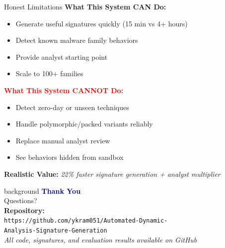 \documentclass[11pt,aspectratio=16:9]{beamer}
\begin{document}
\begin{frame}{Honest Limitations}
  \vspace{0.5cm}
  {\textbf{\textcolor{accent1}{What This System CAN Do:}}}
  \begin{itemize}
    \item Generate useful signatures quickly (15 min vs 4+ hours)
    \item Detect known malware family behaviors
    \item Provide analyst starting point
    \item Scale to 100+ families
  \end{itemize}
  
  \vspace{0.5cm}
  {\textbf{\textcolor{red}{What This System CANNOT Do:}}}
  \begin{itemize}
    \item Detect zero-day or unseen techniques
    \item Handle polymorphic/packed variants reliably
    \item Replace manual analyst review
    \item See behaviors hidden from sandbox
  \end{itemize}
  
  \vspace{0.5cm}
  \begin{tcolorbox}[colback=accent3!10, colframe=accent3, boxrule=2pt]
    \centering
    \textbf{Realistic Value:} \textit{22\% faster signature generation + analyst multiplier}
  \end{tcolorbox}
\end{frame}

\begin{frame}
\vfill
\centering
\begin{beamercolorbox}[center,wd=\paperwidth,ht=\paperheight,sep=0pt]{background}
  \LARGE \textbf{\textcolor{darkblue}{Thank You}}\\[1cm]
  \normalsize
  Questions?\\[1.5cm]
  
  \small
  \textbf{Repository:}\\
  \texttt{https://github.com/ykram051/Automated-Dynamic-}\\
  \texttt{Analysis-Signature-Generation}\\[1.5cm]
  
  {\small \textit{All code, signatures, and evaluation results available on GitHub}}
\end{beamercolorbox}
\vfill
\end{frame}
\end{document}

